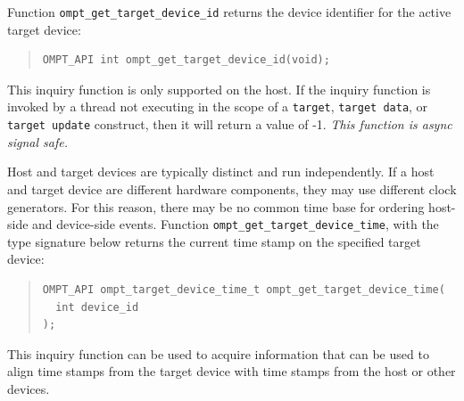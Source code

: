 \documentclass{article}
\begin{document}
Function \verb|ompt_get_target_device_id| returns the device identifier for the active target device:
\begin{quote}
\begin{verbatim}
OMPT_API int ompt_get_target_device_id(void);
\end{verbatim}
\end{quote}
This inquiry function is only supported on the host. If the inquiry function is invoked by a thread not executing in the scope of a {\tt target}, {\tt target data}, or {\tt target update} construct, then it will return a value of -1. {\it This function is async signal safe.}

Host and target devices are typically distinct and run independently. If a
host and target device are different hardware components, they may 
use different clock generators. For this reason,  there may be no common time base for ordering host-side and device-side events.
Function \verb|ompt_get_target_device_time|, with the type signature below returns the current time stamp on the specified target device:
\begin{quote}
\begin{verbatim}
OMPT_API ompt_target_device_time_t ompt_get_target_device_time(
  int device_id
);
\end{verbatim}
\end{quote}
This inquiry function can be used
to acquire information that can be used to align time stamps from the target device with time
stamps from the host or other devices.

\end{document}
